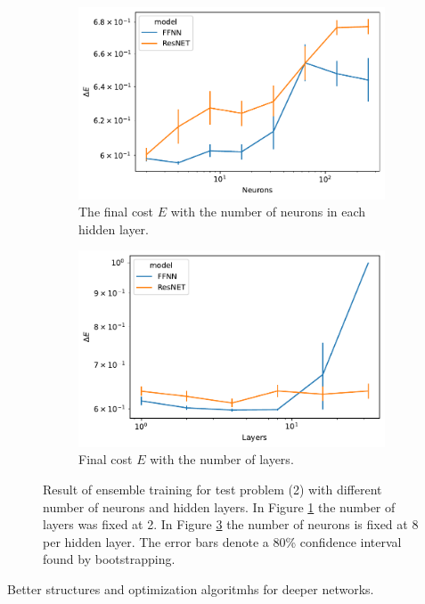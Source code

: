 \begin{figure}[t]\label{fig:curve_2_parmas_eks}
    \begin{subfigure}[t]{0.5\textwidth}
        \centering
        \includegraphics[width=\linewidth]{figures/curve_2/exp_3/neurons_error.pdf}
        \caption{The final cost \(E\) with the number of neurons in each hidden layer.}
        \label{fig:curve_2_neuron_error}
    \end{subfigure}
    \begin{subfigure}[t]{0.5\textwidth}
        \centering
        \includegraphics[width=\linewidth]{figures/curve_2/exp_3/layer_error.pdf}
        \caption{Final cost \(E\) with the number of layers.}
        \label{fig:curve_2_layer_error}
    \end{subfigure}
    \caption{Result of ensemble training for test problem (2) with different number of neurons and hidden layers. In Figure \ref{fig:curve_2_neuron_error} the number of layers was fixed at 2. In Figure \ref{fig:curve_2_layer_error} the number of neurons is fixed at 8 per hidden layer. The error bars denote a 80\% confidence interval found by bootstrapping.}
\end{figure}


Better structures and optimization algoritmhs for deeper networks.
